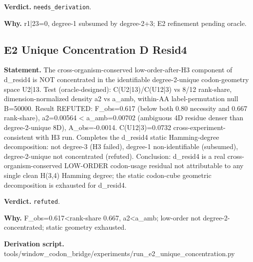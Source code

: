 \textbf{Verdict.} \texttt{needs\_derivation}.

\textbf{Why.} r1|23=0, degree-1 subsumed by degree-2+3; E2 refinement pending oracle.

\subsection{E2 Unique Concentration D Resid4}\label{sec:bridge-e2-unique-concentration-d-resid4}
\textbf{Statement.} The cross-organism-conserved low-order-after-H3 component of d\_resid4 is NOT concentrated in the
identifiable degree-2-unique codon-geometry space U2|13. Test (oracle-designed): C(U2|13)/C(U12|3)
vs 8/12 rank-share, dimension-normalized density a2 vs a\_amb, within-AA label-permutation null
B=50000. Result REFUTED: F\_obs=0.617 (below both 0.80 necessity and 0.667 rank-share), a2=0.00564 <
a\_amb=0.00702 (ambiguous 4D residue denser than degree-2-unique 8D), A\_obs=-0.0014.
C(U12|3)=0.0732 cross-experiment-consistent with H3 run. Completes the d\_resid4 static
Hamming-degree decomposition: not degree-3 (H3 failed), degree-1 non-identifiable (subsumed),
degree-2-unique not concentrated (refuted). Conclusion: d\_resid4 is a real cross-organism-conserved
LOW-ORDER codon-usage residual not attributable to any single clean H(3,4) Hamming degree; the
static codon-cube geometric decomposition is exhausted for d\_resid4.

\textbf{Verdict.} \texttt{refuted}.

\textbf{Why.} F\_obs=0.617<rank-share 0.667, a2<a\_amb; low-order not degree-2-concentrated; static geometry
exhausted.

\textbf{Derivation script.} tools/window\_codon\_bridge/experiments/run\_e2\_unique\_concentration.py

